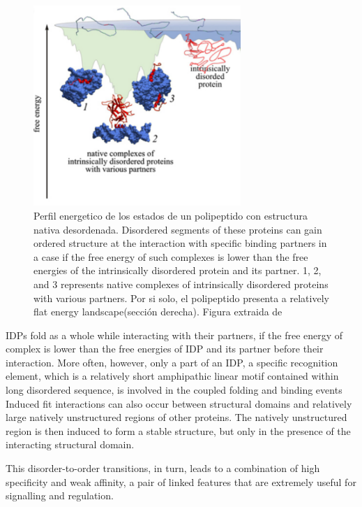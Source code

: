\begin{figure}[h]
\centering
\includegraphics[width=0.7\textwidth]{img/idp-binding-EnLandscape.png} 
\caption{Perfil energetico de los estados de un polipeptido con estructura nativa desordenada. 
Disordered segments of these proteins can gain ordered structure at the interaction with specific binding partners in a case if the free energy of such complexes is lower 
than the free energies of the intrinsically disordered protein and its partner. 
1, 2, and 3 represents native complexes of intrinsically disordered proteins with various partners.
Por si solo, el polipeptido presenta a relatively flat energy landscape(sección derecha). Figura extraida de \cite{turoverov2010protein}}
\label{idpBindingEnLandscape}
\end{figure}


IDPs fold as a whole while interacting with their partners, if the free energy of complex is lower than the free energies of IDP and its partner before their interaction.
More often, however, only a part of an IDP, a specific recognition element, which is a relatively short amphipathic linear motif contained within long disordered sequence, is involved in the coupled folding and binding events
Induced fit interactions can also occur between structural domains and relatively large natively unstructured regions of other proteins. 
The natively unstructured region is then induced to form a stable structure, but only in the presence of the interacting structural domain.

This disorder-to-order transitions, in turn, leads to a combination of high specificity and weak affinity, a pair of linked features that are extremely useful for signalling and regulation.

